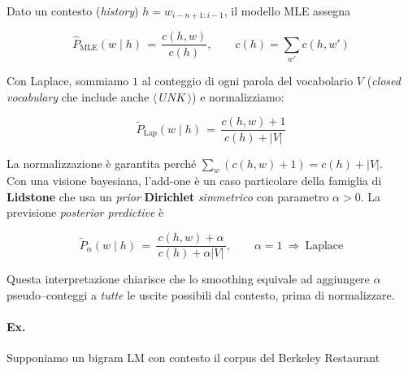         Dato un contesto (\textit{history}) $h=w_{i-n+1:i-1}$, il modello MLE assegna
        
        $$
        \hat P_{\text{MLE}}(w\mid h) \,=\, \frac{c(h,w)}{c(h)}, \qquad c(h)=\sum_{w'} c(h,w')
        $$
        
        Con Laplace, sommiamo $1$ al conteggio di ogni parola del vocabolario $V$ (\textit{closed vocabulary} che include anche $\langle\,UNK\,\rangle$) e normalizziamo:
        
        $$
        \tilde P_{\text{Lap}}(w\mid h) \,=\, \frac{c(h,w)+1}{\,c(h)+|V|\,}
        $$
        
        La normalizzazione è garantita perché $\sum_w (c(h,w)+1)=c(h)+|V|$.\\
        
        Con una visione bayesiana, l'add-one è un caso particolare della famiglia di \textbf{Lidstone} che usa un \textit{prior} \textbf{Dirichlet} \textit{simmetrico} con parametro $\alpha>0$. La previsione \textit{posterior predictive} è
        
        $$
        \tilde P_{\alpha}(w\mid h) \,=\, \frac{c(h,w)+\alpha}{\,c(h)+\alpha|V|\,},\qquad \alpha=1\ \Rightarrow\ \text{Laplace}
        $$
        
        Questa interpretazione chiarisce che lo smoothing equivale ad aggiungere $\alpha$ pseudo–conteggi a \textit{tutte} le uscite possibili dal contesto, prima di normalizzare.
        
        
        \paragraph{Ex.\\}
        Supponiamo un bigram LM con contesto il corpus del Berkeley Restaurant

